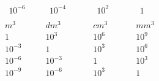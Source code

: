 \documentclass[twocolumn]{article}
\begin{document}
\begin{multicols}{2}
\begin{alignat*}{3}
		10^{-6}\quad &\quad 10^{-4}\quad &&\quad 10^{2}\quad &&\quad 1\quad \quad \\
	\end{alignat*}
	\begin{alignat*}{3} 
		m^3 \quad & \quad dm^3 && \quad cm^3 && \quad mm^3 \\
		1\quad &\quad 10^3\quad &&\quad 10^6\quad &&\quad 10^9\quad \\
		10^{-3}\quad &\quad 1\quad &&\quad 10^{3}\quad &&\quad 10^{6}\quad \quad \\
		10^{-6}\quad &\quad 10^{-3}\quad &&\quad 1\quad &&\quad 10^{3}\quad \quad \\
		10^{-9}\quad &\quad 10^{-6}\quad &&\quad 10^{3}\quad &&\quad 1\quad \quad \\
	\end{alignat*}
\end{multicols}
\end{document}
